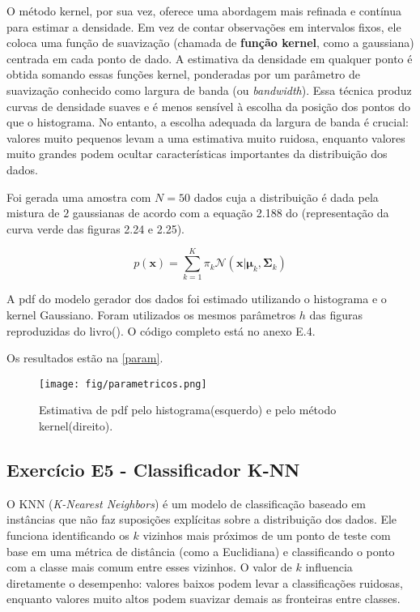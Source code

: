 \documentclass{article}
\begin{document}
 O método kernel, por sua vez, oferece uma abordagem mais refinada e contínua para estimar a densidade. Em vez de contar observações em intervalos fixos, ele coloca uma função de suavização (chamada de \textbf{função kernel}, como a gaussiana) centrada em cada ponto de dado. A estimativa da densidade em qualquer ponto é obtida somando essas funções kernel, ponderadas por um parâmetro de suavização conhecido como largura de banda (ou \textit{bandwidth}). Essa técnica produz curvas de densidade suaves e é menos sensível à escolha da posição dos pontos do que o histograma. No entanto, a escolha adequada da largura de banda é crucial: valores muito pequenos levam a uma estimativa muito ruidosa, enquanto valores muito grandes podem ocultar características importantes da distribuição dos dados.
 
 Foi gerada uma amostra com $N=50$ dados cuja a distribuição é dada pela mistura de $2$ gaussianas de acordo com a equação 2.188 do \cite{Bishop2006} (representação da curva verde das figuras 2.24 e 2.25).
 
    \begin{equation}
    	p(\mathbf{x})= \sum_{k=1}^{K} \pi_{k} \mathcal{N}(\mathbf{x}|\boldsymbol{\mu}_{k}, \boldsymbol{\Sigma}_{k})
    \end{equation}
 
 A pdf do modelo gerador dos dados foi estimado utilizando o histograma e o kernel Gaussiano. Foram  utilizados os mesmos parâmetros $h$ das figuras reproduzidas do livro(\cite{Bishop2006}). O código completo está no anexo E.4. 
 
 Os resultados estão na \autoref{param}.
 
  \begin{figure}[ht]
 	\centering %
 	\texttt{[image: fig/parametricos.png]} %
 	\caption{Estimativa de pdf pelo histograma(esquerdo) e pelo método kernel(direito).} %
 	\label{param} %
 \end{figure} 
 
 
 
 \subsection{ Exerc\'icio E5 - Classificador K-NN}
 
  O KNN (\textit{K-Nearest Neighbors}) é um modelo de classificação baseado em instâncias que não faz suposições explícitas sobre a distribuição dos dados. Ele funciona identificando os $k$ vizinhos mais próximos de um ponto de teste com base em uma métrica de distância (como a Euclidiana) e classificando o ponto com a classe mais comum entre esses vizinhos. O valor de $k$ influencia diretamente o desempenho: valores baixos podem levar a classificações ruidosas, enquanto valores muito altos podem suavizar demais as fronteiras entre classes.
 
\end{document}
